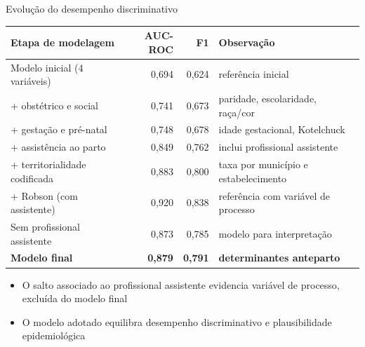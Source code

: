 \documentclass[aspectratio=169,xcolor=table]{beamer}
\begin{document}
\begin{frame}{Evolução do desempenho discriminativo}
    \begin{table}
        \centering
        \scriptsize
        \begin{tabular}{p{4.8cm}rrp{4.2cm}}
            \toprule
            Etapa de modelagem & AUC-ROC & F1 & Observação \\
            \midrule
            Modelo inicial (4 variáveis) & 0{,}694 & 0{,}624 & referência inicial \\
            + obstétrico e social & 0{,}741 & 0{,}673 & paridade, escolaridade, raça/cor \\
            + gestação e pré-natal & 0{,}748 & 0{,}678 & idade gestacional, Kotelchuck \\
            + assistência ao parto & 0{,}849 & 0{,}762 & inclui profissional assistente \\
            + territorialidade codificada & 0{,}883 & 0{,}800 & taxa por município e estabelecimento \\
            + Robson (com assistente) & 0{,}920 & 0{,}838 & referência com variável de processo \\
            Sem profissional assistente & 0{,}873 & 0{,}785 & modelo para interpretação \\
            \textbf{Modelo final} & \textbf{0{,}879} & \textbf{0{,}791} & \textbf{determinantes anteparto} \\
            \bottomrule
        \end{tabular}
    \end{table}

    \vspace{0.3em}
    \begin{itemize}
        \item O salto associado ao profissional assistente evidencia variável de processo, excluída do modelo final
        \item O modelo adotado equilibra desempenho discriminativo e plausibilidade epidemiológica
    \end{itemize}
\end{frame}
\end{document}
